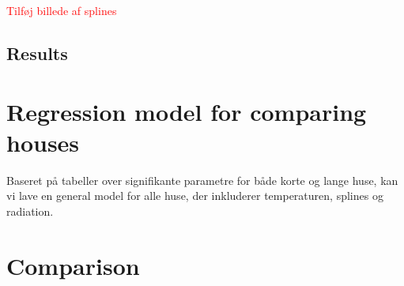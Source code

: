 \textcolor{red}{Tilføj billede af splines}




\subsection{Results}

\section{Regression model for comparing houses}
Baseret på tabeller over signifikante parametre for både korte og lange huse, kan vi lave en general model for alle huse, der inkluderer temperaturen, splines og radiation. 

\section{Comparison}